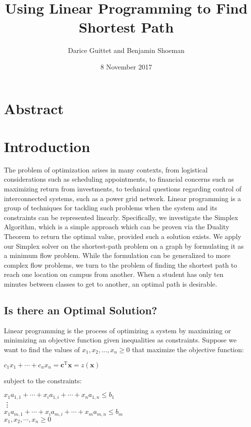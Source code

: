 \documentclass[12pt]{article}
\title{Using Linear Programming to Find Shortest Path}
\author{Darice Guittet and Benjamin Shoeman}
\date{8 November 2017}
\begin{document}
\maketitle

\section{Abstract}



\section{Introduction}
The problem of optimization arises in many contexts, from logistical considerations such as scheduling appointments, to financial concerns such as maximizing return from investments, to technical questions regarding control of interconnected systems, such as a power grid network. Linear programming is a group of techniques for tackling such problems when the system and its constraints can be represented linearly. Specifically, we investigate the Simplex Algorithm, which is a simple approach which can be proven via the Duality Theorem to return the optimal value, provided such a solution exists. We apply our Simplex solver on the shortest-path problem on a graph by formulating it as a minimum flow problem. While the formulation can be generalized to more complex flow problems, we turn to the problem of finding the shortest path to reach one location on campus from another. When a student has only ten minutes between classes to get to another, an optimal path is desirable. 

\subsection{Is there an Optimal Solution?}
Linear programming is the process of optimizing a system by maximizing or minimizing an objective function given inequalities as constraints. Suppose we want to find the values of $x_1, x_2, \ldots, x_n \geq 0$ that maximize the objective function:

\begin{center}
     $c_1x_1 + \cdots + c_nx_n = \mathbf{c}^\text{T}\mathbf{x} = z(\mathbf{x})$\\
\end{center}

subject to the constraints:
\begin{center}
    $x_1a_{1,1} +  \cdots + x_ia_{1,i} + \cdots +  x_na_{1,n} \leq b_1$ \\
\hspace{0cm} \vdots \\
    $x_1a_{m,1} + \cdots + x_ia_{m,i} + \cdots +  x_ma_{m,n} \leq b_m$ \\
    $x_1, x_2, \cdots, x_n \geq 0$
\end{center} 
\end{document}
